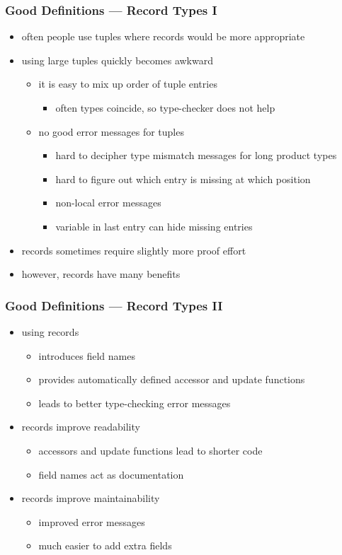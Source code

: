 \begin{frame}[fragile]
\frametitle{Good Definitions --- Record Types I}
\begin{itemize}
\item often people use tuples where records would be more appropriate
\item using large tuples quickly becomes awkward
\begin{itemize}
\item it is easy to mix up order of tuple entries
\begin{itemize}
\item often types coincide, so type-checker does not help
\end{itemize}
\item no good error messages for tuples
\begin{itemize}
\item hard to decipher type mismatch messages for long product types
\item hard to figure out which entry is missing at which position
\item non-local error messages
\item variable in last entry can hide missing entries
\end{itemize}
\end{itemize}
\item records sometimes require slightly more proof effort
\item however, records have many benefits
\end{itemize}
\end{frame}

\begin{frame}[fragile]
\frametitle{Good Definitions --- Record Types II}
\begin{itemize}
\item using records
\begin{itemize}
\item introduces field names
\item provides automatically defined accessor and update functions
\item leads to better type-checking error messages
\end{itemize}
\item records improve readability
\begin{itemize}
\item accessors and update functions lead to shorter code
\item field names act as documentation
\end{itemize}
\item records improve maintainability
\begin{itemize}
\item improved error messages
\item much easier to add extra fields
\end{itemize}
\end{itemize}
\end{frame}


